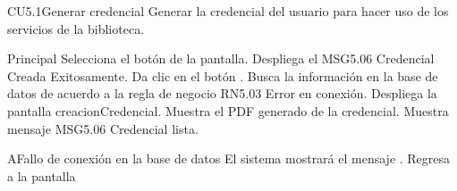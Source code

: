 \begin{UseCase}{CU5.1}{Generar credencial}{
	Generar la credencial del usuario para hacer uso de los servicios de la biblioteca.
}


\end{UseCase}



\begin{UCtrayectoria}{Principal}
	\UCpaso[\UCactor] Selecciona el botón  de la pantalla.
	\UCpaso[\UCsist] Despliega el MSG5.06 Credencial Creada Exitosamente.
	\UCpaso[\UCactor] Da clic en el botón .
	\UCpaso[\UCsist] Busca la información en la base de datos de acuerdo a la regla de negocio RN5.03 Error en conexión. 
	\UCpaso[\UCsist] Despliega la pantalla  creacionCredencial.
	\UCpaso[\UCsist] Muestra el PDF generado de la credencial.
	\UCpaso[\UCsist] Muestra mensaje MSG5.06 Credencial lista.
	
\end{UCtrayectoria}

\begin{UCtrayectoriaA}{A}{Fallo de conexión en la base de datos}
			\UCpaso[\UCsist] El sistema mostrará el mensaje .
			\UCpaso[\UCsist] Regresa a la pantalla 	
\end{UCtrayectoriaA}
